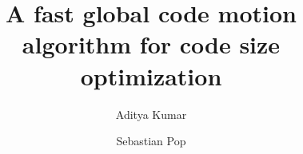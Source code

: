 \documentclass[acmlarge,review,anonymous]{acmart}\settopmatter{printfolios=true}
\begin{document}
\title[SSA GCM]{A fast global code motion algorithm for code size optimization}         %

\def \GCC {GCC}
\def \LLVM {LLVM}
\def \CFG {CFG}
\def \SSA {SSA}
\def \MemorySSA {MemorySSA}
\def \PRE {PRE}
\def \GVN {GVN}
\def \SPEC {SPEC Cpu 2006}
\def \gcm {global-code-motion}
\def \GCM {GCM}
\def \xlinux {x86\_64-linux}
\def \ooo {out-of-order}


\author{Aditya Kumar}


\author{Sebastian Pop}
\end{document}
